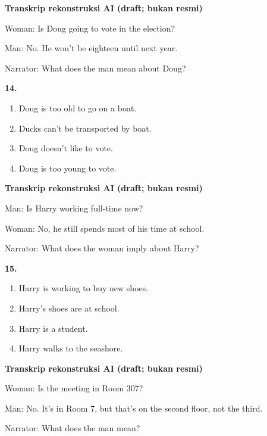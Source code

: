 \documentclass[12pt]{article}
\begin{document}
\par
\vspace{0.25\baselineskip}
\begin{exampleblock}
\textbf{Transkrip rekonstruksi AI (draft; bukan resmi)}\par
Woman: Is Doug going to vote in the election?\par
Man: No. He won't be eighteen until next year.\par
Narrator: What does the man mean about Doug?\par
\end{exampleblock}
\noindent\textbf{14.}
\begin{enumerate}[label=(\Alph*),leftmargin=*,itemsep=0.2em]
\item Doug is too old to go on a boat.
\item Ducks can't be transported by boat.
\item Doug doesn't like to vote.
\item Doug is too young to vote.
\end{enumerate}
\par
\vspace{0.25\baselineskip}
\begin{exampleblock}
\textbf{Transkrip rekonstruksi AI (draft; bukan resmi)}\par
Man: Is Harry working full-time now?\par
Woman: No, he still spends most of his time at school.\par
Narrator: What does the woman imply about Harry?\par
\end{exampleblock}
\noindent\textbf{15.}
\begin{enumerate}[label=(\Alph*),leftmargin=*,itemsep=0.2em]
\item Harry is working to buy new shoes.
\item Harry's shoes are at school.
\item Harry is a student.
\item Harry walks to the seashore.
\end{enumerate}
\par
\vspace{0.25\baselineskip}
\begin{exampleblock}
\textbf{Transkrip rekonstruksi AI (draft; bukan resmi)}\par
Woman: Is the meeting in Room 307?\par
Man: No. It's in Room 7, but that's on the second floor, not the third.\par
Narrator: What does the man mean?\par
\end{exampleblock}
\end{document}
